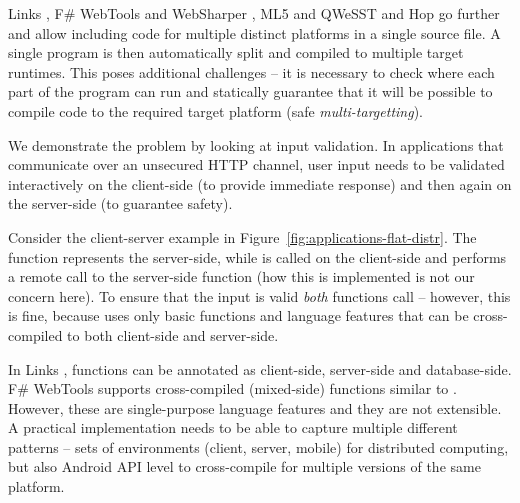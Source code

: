 Links \cite{app-distributed-links}, F\# WebTools and WebSharper \cite{app-fsharp-webapps,app-fsharp-webtools},
ML5 and QWeSST \cite{app-distributed-ml5, app-distributed-qwesst} and Hop \cite{app-hop-lang} go
further and allow including code for multiple distinct platforms in a single source file.
A single program is then automatically split and compiled to multiple target runtimes. This
poses additional challenges -- it is necessary to check where each part of the program can run
and statically guarantee that it will be possible to compile code to the required target
platform (safe \emph{multi-targetting}).

We demonstrate the problem by looking at input validation. In applications that communicate over
an unsecured HTTP channel, user input needs to be validated interactively on the client-side (to
provide immediate response) and then again on the server-side (to guarantee safety).

Consider the client-server example in Figure~\ref{fig:applications-flat-distr}. The
 function represents the server-side, while  is called
on the client-side and performs a remote call to the server-side function (how this is implemented
is not our concern here). To ensure that the input is valid \emph{both} functions call
 -- however, this is fine, because  uses only basic
functions and language features that can be cross-compiled to both client-side and server-side.

In Links \cite{app-distributed-links}, functions can be annotated as client-side, server-side
and database-side. F\# WebTools \cite{app-fsharp-webtools} supports cross-compiled (mixed-side)
functions similar to . However, these are single-purpose language features
and they are not extensible. A practical implementation needs to be able to capture multiple
different patterns -- sets of environments (client, server, mobile) for distributed computing,
but also Android API level \cite{app-android-multitarget} to cross-compile for multiple versions
of the same platform.


